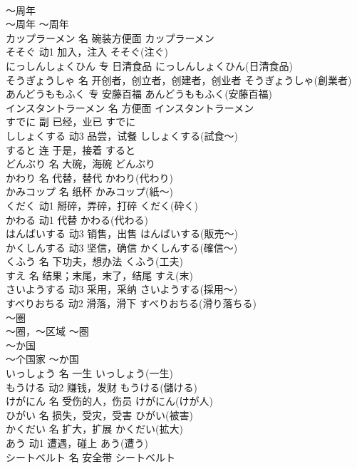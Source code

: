 \documentclass[8pt]{extreport}
\begin{document}
\begin{CJK}{UTF8}{min}
\\	～周年	
\\	～周年	～周年	
\\	カップラーメン	名	碗装方便面	カップラーメン	
\\	そそぐ	动1	加入，注入	そそぐ(注ぐ)	
\\	にっしんしょくひん	专	日清食品	にっしんしょくひん(日清食品)	
\\	そうぎょうしゃ	名	开创者，创立者，创建者，创业者	そうぎょうしゃ(創業者)	
\\	あんどうももふく	专	安藤百福	あんどうももふく(安藤百福)	
\\	インスタントラーメン	名	方便面	インスタントラーメン	
\\	すでに	副	已经，业已	すでに	
\\	ししょくする	动3	品尝，试餐	ししょくする(試食～)	
\\	すると	连	于是，接着	すると	
\\	どんぶり	名	大碗，海碗	どんぶり	
\\	かわり	名	代替，替代	かわり(代わり)	
\\	かみコップ	名	纸杯	かみコップ(紙～)	
\\	くだく	动1	掰碎，弄碎，打碎	くだく(砕く)	
\\	かわる	动1	代替	かわる(代わる)	
\\	はんばいする	动3	销售，出售	はんばいする(販売～)	
\\	かくしんする	动3	坚信，确信	かくしんする(確信～)	
\\	くふう	名	下功夫，想办法	くふう(工夫)	
\\	すえ	名	结果；末尾，末了，结尾	すえ(末)	
\\	さいようする	动3	采用，采纳	さいようする(採用～)	
\\	すべりおちる	动2	滑落，滑下	すべりおちる(滑り落ちる)	
\\	～圏	
\\	～圈，～区域	～圏	
\\	～か国	
\\	～个国家	～か国	
\\	いっしょう	名	一生	いっしょう(一生)	
\\	もうける	动2	赚钱，发财	もうける(儲ける)	
\\	けがにん	名	受伤的人，伤员	けがにん(けが人)	
\\	ひがい	名	损失，受灾，受害	ひがい(被害)	
\\	かくだい	名	扩大，扩展	かくだい(拡大)	
\\	あう	动1	遭遇，碰上	あう(遭う)	
\\	シートベルト	名	安全带	シートベルト	

\end{CJK}
\end{document}

